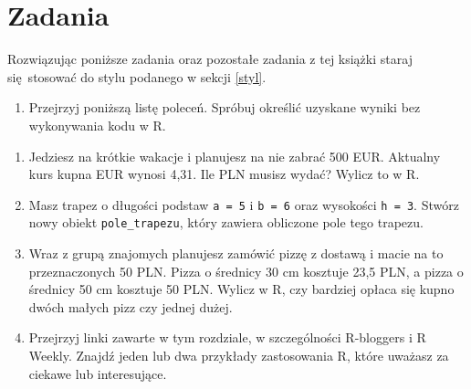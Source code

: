 \documentclass[paper=6in:9in,pagesize=pdftex,headinclude=on,footinclude=on,10pt]{scrbook}
\newenvironment{Shaded}{\begin{snugshade}}{\end{snugshade}}
\newcommand{\DecValTok}[1]{\textcolor[rgb]{0.00,0.00,0.81}{#1}}
\newcommand{\NormalTok}[1]{#1}
\newcommand{\OperatorTok}[1]{\textcolor[rgb]{0.81,0.36,0.00}{\textbf{#1}}}
\newcommand{\StringTok}[1]{\textcolor[rgb]{0.31,0.60,0.02}{#1}}
\providecommand{\tightlist}{%
  \setlength{\itemsep}{0pt}\setlength{\parskip}{0pt}}
\begin{document}
\hypertarget{zadania-1}{%
\section{Zadania}\label{zadania-1}}

Rozwiązując poniższe zadania oraz pozostałe zadania z tej książki staraj się~stosować do stylu podanego w sekcji \ref{styl}.

\begin{enumerate}
\def\labelenumi{\arabic{enumi})}
\tightlist
\item
  Przejrzyj poniższą listę poleceń.
  Spróbuj określić uzyskane wyniki bez wykonywania kodu w R.
\end{enumerate}

\begin{Shaded}
\end{Shaded}

\begin{enumerate}
\def\labelenumi{\arabic{enumi})}
\setcounter{enumi}{1}
\item
  Jedziesz na krótkie wakacje i planujesz na nie zabrać 500 EUR.
  Aktualny kurs kupna EUR wynosi 4,31.
  Ile PLN musisz wydać?
  Wylicz to w R.
\item
  Masz trapez o długości podstaw \texttt{a\ =\ 5} i \texttt{b\ =\ 6} oraz wysokości \texttt{h\ =\ 3}.
  Stwórz nowy obiekt \texttt{pole\_trapezu}, który zawiera obliczone pole tego trapezu.
\item
  Wraz z grupą znajomych planujesz zamówić pizzę z dostawą i macie na to przeznaczonych 50 PLN.
  Pizza o średnicy 30 cm kosztuje 23,5 PLN, a pizza o średnicy 50 cm kosztuje 50 PLN.
  Wylicz w R, czy bardziej opłaca się kupno dwóch małych pizz czy jednej dużej.
\item
  Przejrzyj linki zawarte w tym rozdziale, w szczególności R-bloggers i R Weekly.
  Znajdź jeden lub dwa przykłady zastosowania R, które uważasz za ciekawe lub interesujące.
\end{enumerate}
\end{document}
